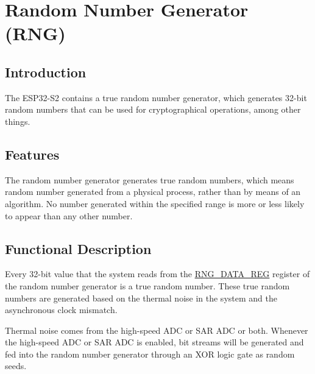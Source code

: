 \documentclass[main\_\_EN.tex]{subfiles}
\begin{document}

\ifglobal
\else
    {\let\clearpage\relax \listoftodos}
    {\let\clearpage\relax \listofdonetodos}
    \tableofcontents
\fi



\hypertarget{rng}{}
\chapter{Random Number Generator (RNG)}
\label{mod:rng}


\section{Introduction}

The ESP32-S2 contains a true random number generator, which generates 32-bit random numbers that can be used for cryptographical operations, among other things.

\section{Features}

The random number generator generates true random numbers, which means random number generated from a physical process, rather than by means of an algorithm. No number generated within the specified range is more or less likely to appear than any other number.

\section{Functional Description}\label{sec:rng-func-descr}

Every 32-bit value that the system reads from the \hyperref[regdesc:RNGDATAREG]{RNG\_DATA\_REG} register of the random number generator is a true random number. These true random numbers are generated based on the thermal noise in the system and the asynchronous clock mismatch.

Thermal noise comes from the high-speed ADC or SAR ADC or both. Whenever the high-speed ADC or SAR ADC is enabled, bit streams will be generated and fed into the random number generator through an XOR logic gate as random seeds.
\end{document}
